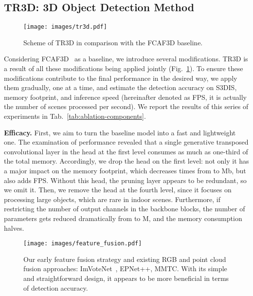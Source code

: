 \documentclass{article}
\def\ours{TR3D}
\newcommand\inline{\noindent\textbf}
\begin{document}
\subsection{\ours: 3D Object Detection Method}
\label{ssec:3d-object-detection}

\begin{figure}[t!]
    \begin{center}
        \texttt{[image: images/tr3d.pdf]}
    \end{center}
    \caption{Scheme of TR3D in comparison with the FCAF3D baseline.}
\label{fig:scheme}
\end{figure}

Considering FCAF3D~\cite{rukhovich2022fcaf3d} as a baseline, we introduce several modifications. \ours{} is a result of all these modifications being applied jointly (Fig.~\ref{fig:scheme}). To ensure these modifications contribute to the final performance in the desired way, we apply them gradually, one at a time, and estimate the detection accuracy on S3DIS, memory footprint, and inference speed (hereinafter denoted as FPS, it is actually the number of scenes processed per second). We report the results of this series of experiments in Tab.~\ref{tab:ablation-components}.

\inline{Efficacy.} First, we aim to turn the baseline model into a fast and lightweight one. The examination of performance revealed that a single generative transposed convolutional layer in the head at the first level consumes as much as one-third of the total memory. Accordingly, we drop the head on the first level: not only it has a major impact on the memory footprint, which decreases  times from  to  Mb, but also adds  FPS. Without this head, the pruning layer appears to be redundant, so we omit it. Then, we remove the head at the fourth level, since it focuses on processing large objects, which are rare in indoor scenes. Furthermore, if restricting the number of output channels in the backbone blocks, the number of parameters gets reduced dramatically from  to  M, and the memory consumption halves. 

\begin{figure*}[h!]
    \begin{center}
        \texttt{[image: images/feature\_fusion.pdf]}
    \end{center}
    \caption{Our early feature fusion strategy and existing RGB and point cloud fusion approaches: ImVoteNet~\cite{qi2020imvotenet}, EPNet++\cite{liu2021epnetcb}, MMTC\cite{park2021multimodal}. With its simple and straightforward design, it appears to be more beneficial in terms of detection accuracy.
    }
\label{fig:feature-fusion}
\end{figure*}
\end{document}

